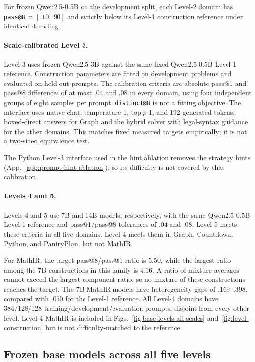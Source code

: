 \documentclass{article}
\makeatletter
\newcommand{\1}{\mathbf 1}
\newcommand{\distk}{\texttt{distinct@8}}
\theoremstyle{remark}
\theoremstyle{definition}
\theoremstyle{plain}
\makeatother
\begin{document}
For frozen Qwen2.5-0.5B on the development split, each Level-2 domain has
\texttt{pass@8} in $[.10,.90]$ and strictly below its Level-1 construction
reference under identical decoding.

\paragraph{Scale-calibrated Level 3.}
Level 3 uses frozen Qwen2.5-3B against the same fixed Qwen2.5-0.5B Level-1
reference. Construction parameters are fitted on development problems and evaluated on
held-out prompts. The calibration criteria are absolute pass@1 and pass@8
differences of at most $.04$ and $.08$ in every domain, using four independent
groups of eight samples per prompt. \distk{} is not a fitting objective. The
interface uses native chat, temperature 1, top-$p$ 1, and 192 generated
tokens: boxed-direct answers for Graph and the hybrid solver with
legal-syntax guidance for the other domains. This matches fixed measured
targets empirically; it is not a two-sided equivalence test.

The Python Level-3 interface used in the hint ablation removes the strategy
hints (App.~\ref{app:prompt-hint-ablation}), so its difficulty is not
covered by that calibration.

\paragraph{Levels 4 and 5.}
Levels 4 and 5 use 7B and 14B models, respectively, with the same
Qwen2.5-0.5B Level-1 reference and pass@1/pass@8 tolerances of $.04$ and $.08$.
Level 5 meets these criteria in all five domains. Level 4 meets them in Graph,
Countdown, Python, and PantryPlan, but not MathIR.

For MathIR, the target pass@8/pass@1 ratio is $5.50$, while the largest ratio
among the 7B constructions in this family is $4.16$. A ratio of mixture
averages cannot exceed the largest component ratio, so no mixture of these
constructions reaches the target. The 7B MathIR models have heterogeneity
gaps of $.169$--$.398$, compared with $.060$ for the Level-1 reference. All
Level-4 domains have 384/128/128 training/development/evaluation prompts,
disjoint from every other level. Level-4 MathIR is included in
Figs.~\ref{fig:base-levels-all-scales} and~\ref{fig:level-construction}
but is not difficulty-matched to the reference.

\subsection{Frozen base models across all five levels}
\label{app:base-levels-all-scales}
\end{document}
